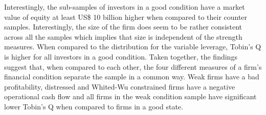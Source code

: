 \documentclass[12pt]{article}
\begin{document}
Interestingly, the sub-samples of investors in a good condition have a market value of equity at least US\$ 10 billion higher when compared to their counter samples. Interestingly, the size of the firm does seem to be rather consistent across all the samples which implies that size is independent of the strength measures. When compared to the distribution for the variable leverage, Tobin's Q is higher for all investors in a good condition.
Taken together, the findings suggest that, when compared to each other, the four different measures of a firm's financial condition separate the sample in a common way. Weak firms have a bad profitability, distressed and Whited-Wu constrained firms have a negative operational cash flow and all firms in the weak condition sample have significant lower Tobin's Q when compared to firms in a good state. 
\end{document}
